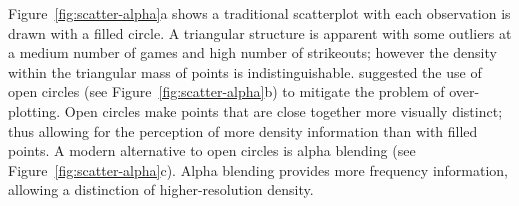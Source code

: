 Figure~\ref{fig:scatter-alpha}a shows a traditional scatterplot with each observation is drawn with a filled circle. A triangular structure is apparent with some outliers at a medium number of games and high number of strikeouts; however the density within the triangular mass of points is indistinguishable. \citet{tukey} suggested the use of open circles (see Figure~\ref{fig:scatter-alpha}b) to mitigate the problem of over-plotting. Open circles make points that are close together more visually distinct; thus allowing for the perception of more density information than with filled points.  A modern alternative to open circles is alpha blending (see Figure~\ref{fig:scatter-alpha}c). Alpha blending provides more frequency information, allowing a distinction of higher-resolution density. 

\begin{figure}[hbtp]
  

\end{figure}
